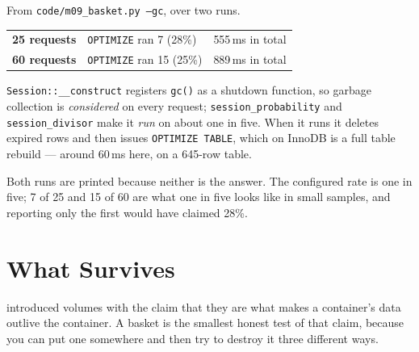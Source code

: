 \begin{measured}
From \texttt{code/m09\_basket.py --gc}, over two runs.

\smallskip
\begin{tabular}{@{}L{4.6cm}L{4.2cm}L{4.4cm}@{}}
\textbf{25 requests} & \texttt{OPTIMIZE} ran 7 (28\%) & 555\,ms in total \\
\textbf{60 requests} & \texttt{OPTIMIZE} ran 15 (25\%) & 889\,ms in total \\
\end{tabular}

\smallskip
\texttt{Session::\_\_construct} registers \texttt{gc()} as a shutdown function,
so garbage collection is \emph{considered} on every request;
\texttt{session\_probability} and \texttt{session\_divisor} make it \emph{run}
on about one in five. When it runs it deletes expired rows and then issues
\texttt{OPTIMIZE TABLE}, which on InnoDB is a full table rebuild --- around
60\,ms here, on a 645-row table.

\smallskip
Both runs are printed because neither is the answer. The configured rate is
one in five; 7 of 25 and 15 of 60 are what one in five looks like in small
samples, and reporting only the first would have claimed 28\%.
\end{measured}

\section{What Survives}

 introduced volumes with the claim that they are what makes a
container's data outlive the container. A basket is the smallest honest test of
that claim, because you can put one somewhere and then try to destroy it three
different ways.

